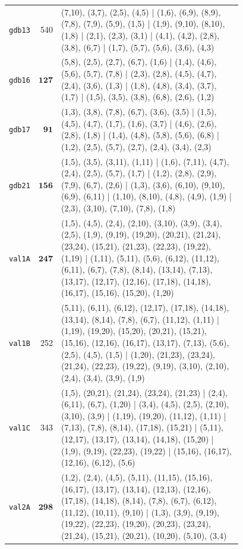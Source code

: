 \begin{landscape}
\begin{longtable}{lr>{\tiny\raggedright\arraybackslash}p{0.78\linewidth}}
\texttt{gdb13} & 540 & (7,10), (3,7), (2,5), (4,5) | (1,6), (6,9), (8,9), (7,8), (7,9), (5,9), (1,5) | (1,9), (9,10), (8,10), (1,8) | (2,1), (2,3), (3,1) | (4,1), (4,2), (2,8), (3,8), (6,7) | (1,7), (5,7), (5,6), (3,6), (4,3) \\[2pt]
\texttt{gdb16} & $\mathbf{127}$ & (5,8), (2,5), (2,7), (6,7), (1,6) | (1,4), (4,6), (5,6), (5,7), (7,8) | (2,3), (2,8), (4,5), (4,7), (2,4), (3,6), (1,3) | (1,8), (4,8), (3,4), (3,7), (1,7) | (1,5), (3,5), (3,8), (6,8), (2,6), (1,2) \\[2pt]
\texttt{gdb17} & $\mathbf{91}$ & (1,3), (3,8), (7,8), (6,7), (3,6), (3,5) | (1,5), (4,5), (4,7), (1,7), (1,6), (3,7) | (4,6), (2,6), (2,8), (1,8) | (1,4), (4,8), (5,8), (5,6), (6,8) | (1,2), (2,5), (5,7), (2,7), (2,4), (3,4), (2,3) \\[2pt]
\texttt{gdb21} & $\mathbf{156}$ & (1,5), (3,5), (3,11), (1,11) | (1,6), (7,11), (4,7), (2,4), (2,5), (5,7), (1,7) | (1,2), (2,8), (2,9), (7,9), (6,7), (2,6) | (1,3), (3,6), (6,10), (9,10), (6,9), (6,11) | (1,10), (8,10), (4,8), (4,9), (1,9) | (2,3), (3,10), (7,10), (7,8), (1,8) \\[2pt]
\texttt{val1A} & $\mathbf{247}$ & (1,5), (4,5), (2,4), (2,10), (3,10), (3,9), (3,4), (2,5), (1,9), (9,19), (19,20), (20,21), (21,24), (23,24), (15,21), (21,23), (22,23), (19,22), (1,19) | (1,11), (5,11), (5,6), (6,12), (11,12), (6,11), (6,7), (7,8), (8,14), (13,14), (7,13), (13,17), (12,17), (12,16), (17,18), (14,18), (16,17), (15,16), (15,20), (1,20) \\[2pt]
\texttt{val1B} & 252 & (5,11), (6,11), (6,12), (12,17), (17,18), (14,18), (13,14), (8,14), (7,8), (6,7), (11,12), (1,11) | (1,19), (19,20), (15,20), (20,21), (15,21), (15,16), (12,16), (16,17), (13,17), (7,13), (5,6), (2,5), (4,5), (1,5) | (1,20), (21,23), (23,24), (21,24), (22,23), (19,22), (9,19), (3,10), (2,10), (2,4), (3,4), (3,9), (1,9) \\[2pt]
\texttt{val1C} & 343 & (1,5), (20,21), (21,24), (23,24), (21,23) | (2,4), (6,11), (6,7), (1,20) | (3,4), (4,5), (2,5), (2,10), (3,10), (3,9) | (1,19), (19,20), (11,12), (1,11) | (7,13), (7,8), (8,14), (17,18), (15,21) | (5,11), (12,17), (13,17), (13,14), (14,18), (15,20) | (1,9), (9,19), (22,23), (19,22) | (15,16), (16,17), (12,16), (6,12), (5,6) \\[2pt]
\texttt{val2A} & $\mathbf{298}$ & (1,2), (2,4), (4,5), (5,11), (11,15), (15,16), (16,17), (13,17), (13,14), (12,13), (12,16), (17,18), (14,18), (8,14), (7,8), (6,7), (6,12), (11,12), (10,11), (9,10) | (1,3), (3,9), (9,19), (19,22), (22,23), (19,20), (20,23), (23,24), (21,24), (15,21), (20,21), (10,20), (5,10), (3,4) \\[2pt]

\end{longtable}
\end{landscape}
